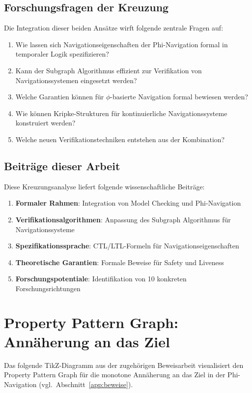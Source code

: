 ﻿\documentclass[a4paper,12pt]{article}
\theoremstyle{definition}
\begin{document}
\subsection{Forschungsfragen der Kreuzung}

Die Integration dieser beiden Ansätze wirft folgende zentrale Fragen auf:

\begin{enumerate}
	\item Wie lassen sich Navigationseigenschaften der Phi-Navigation formal in temporaler Logik spezifizieren?
	\item Kann der Subgraph Algorithmus effizient zur Verifikation von Navigationssystemen eingesetzt werden?
	\item Welche Garantien können für $\phi$-basierte Navigation formal bewiesen werden?
	\item Wie können Kripke-Strukturen für kontinuierliche Navigationssysteme konstruiert werden?
	\item Welche neuen Verifikationstechniken entstehen aus der Kombination?
\end{enumerate}

\subsection{Beiträge dieser Arbeit}

Diese Kreuzungsanalyse liefert folgende wissenschaftliche Beiträge:

\begin{enumerate}
	\item \textbf{Formaler Rahmen}: Integration von Model Checking und Phi-Navigation
	\item \textbf{Verifikationsalgorithmen}: Anpassung des Subgraph Algorithmus für Navigationssysteme
	\item \textbf{Spezifikationssprache}: CTL/LTL-Formeln für Navigationseigenschaften
	\item \textbf{Theoretische Garantien}: Formale Beweise für Safety und Liveness
	\item \textbf{Forschungspotentiale}: Identifikation von 10 konkreten Forschungsrichtungen
\end{enumerate}


\section{Property Pattern Graph: Annäherung an das Ziel}\label{sec:tikz}

Das folgende TikZ-Diagramm aus der zugehörigen Beweisarbeit visualisiert den Property Pattern Graph für die monotone Annäherung an das Ziel in der Phi-Navigation (vgl.~Abschnitt~\ref{app:beweise}).
\end{document}
